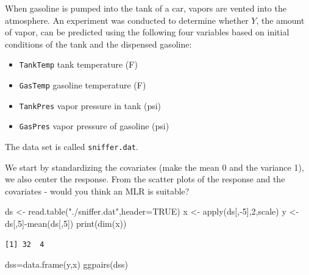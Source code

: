 \documentclass[
  letterpaper,
  DIV=11,
  numbers=noendperiod]{scrartcl}
\newenvironment{Shaded}{\begin{snugshade}}{\end{snugshade}}
\newcommand{\AttributeTok}[1]{\textcolor[rgb]{0.40,0.45,0.13}{#1}}
\newcommand{\ConstantTok}[1]{\textcolor[rgb]{0.56,0.35,0.01}{#1}}
\newcommand{\DecValTok}[1]{\textcolor[rgb]{0.68,0.00,0.00}{#1}}
\newcommand{\FunctionTok}[1]{\textcolor[rgb]{0.28,0.35,0.67}{#1}}
\newcommand{\NormalTok}[1]{\textcolor[rgb]{0.00,0.23,0.31}{#1}}
\newcommand{\OtherTok}[1]{\textcolor[rgb]{0.00,0.23,0.31}{#1}}
\newcommand{\SpecialCharTok}[1]{\textcolor[rgb]{0.37,0.37,0.37}{#1}}
\newcommand{\StringTok}[1]{\textcolor[rgb]{0.13,0.47,0.30}{#1}}
\providecommand{\tightlist}{%
  \setlength{\itemsep}{0pt}\setlength{\parskip}{0pt}}\usepackage{longtable,booktabs,array}
\begin{document}
When gasoline is pumped into the tank of a car, vapors are vented into
the atmosphere. An experiment was conducted to determine whether \(Y\),
the amount of vapor, can be predicted using the following four variables
based on initial conditions of the tank and the dispensed gasoline:

\begin{itemize}
\tightlist
\item
  \texttt{TankTemp} tank temperature (F)
\item
  \texttt{GasTemp} gasoline temperature (F)
\item
  \texttt{TankPres} vapor pressure in tank (psi)
\item
  \texttt{GasPres} vapor pressure of gasoline (psi)
\end{itemize}

The data set is called \texttt{sniffer.dat}.

We start by standardizing the covariates (make the mean 0 and the
variance 1), we also center the response. From the scatter plots of the
response and the covariates - would you think an MLR is suitable?

\begin{Shaded}
\begin{Highlighting}[]
\NormalTok{ds }\OtherTok{\textless{}{-}} \FunctionTok{read.table}\NormalTok{(}\StringTok{"./sniffer.dat"}\NormalTok{,}\AttributeTok{header=}\ConstantTok{TRUE}\NormalTok{)}
\NormalTok{x }\OtherTok{\textless{}{-}} \FunctionTok{apply}\NormalTok{(ds[,}\SpecialCharTok{{-}}\DecValTok{5}\NormalTok{],}\DecValTok{2}\NormalTok{,scale)}
\NormalTok{y }\OtherTok{\textless{}{-}}\NormalTok{ ds[,}\DecValTok{5}\NormalTok{]}\SpecialCharTok{{-}}\FunctionTok{mean}\NormalTok{(ds[,}\DecValTok{5}\NormalTok{])}
\FunctionTok{print}\NormalTok{(}\FunctionTok{dim}\NormalTok{(x))}
\end{Highlighting}
\end{Shaded}

\begin{verbatim}
[1] 32  4
\end{verbatim}

\begin{Shaded}
\begin{Highlighting}[]
\NormalTok{dss}\OtherTok{=}\FunctionTok{data.frame}\NormalTok{(y,x)}
\FunctionTok{ggpairs}\NormalTok{(dss)}
\end{Highlighting}
\end{Shaded}
\end{document}
